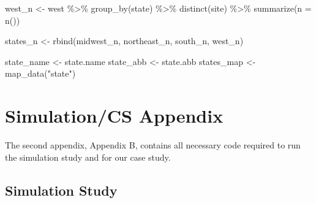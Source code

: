 \documentclass[12pt, twoside]{amherstthesis}
\newenvironment{Shaded}{\begin{snugshade}}{\end{snugshade}}
\newcommand{\AttributeTok}[1]{\textcolor[rgb]{0.77,0.63,0.00}{#1}}
\newcommand{\FunctionTok}[1]{\textcolor[rgb]{0.00,0.00,0.00}{#1}}
\newcommand{\NormalTok}[1]{#1}
\newcommand{\OtherTok}[1]{\textcolor[rgb]{0.56,0.35,0.01}{#1}}
\newcommand{\SpecialCharTok}[1]{\textcolor[rgb]{0.00,0.00,0.00}{#1}}
\newcommand{\StringTok}[1]{\textcolor[rgb]{0.31,0.60,0.02}{#1}}
\begin{document}
\begin{Shaded}
\begin{Highlighting}[]
\NormalTok{west\_n }\OtherTok{\textless{}{-}}\NormalTok{ west }\SpecialCharTok{\%\textgreater{}\%}
  \FunctionTok{group\_by}\NormalTok{(state) }\SpecialCharTok{\%\textgreater{}\%}
  \FunctionTok{distinct}\NormalTok{(site) }\SpecialCharTok{\%\textgreater{}\%}
  \FunctionTok{summarize}\NormalTok{(}\AttributeTok{n =} \FunctionTok{n}\NormalTok{())}

\NormalTok{states\_n }\OtherTok{\textless{}{-}} \FunctionTok{rbind}\NormalTok{(midwest\_n, northeast\_n, south\_n, west\_n)}

\NormalTok{state\_name }\OtherTok{\textless{}{-}}\NormalTok{ state.name}
\NormalTok{state\_abb }\OtherTok{\textless{}{-}}\NormalTok{ state.abb}
\NormalTok{states\_map }\OtherTok{\textless{}{-}} \FunctionTok{map\_data}\NormalTok{(}\StringTok{"state"}\NormalTok{)}
\end{Highlighting}
\end{Shaded}
\hypertarget{simulationcs-appendix}{%
\chapter{Simulation/CS Appendix}\label{simulationcs-appendix}}

The second appendix, Appendix B, contains all necessary code required to run the simulation study and for our case study.

\hypertarget{simulation-study}{%
\section{Simulation Study}\label{simulation-study}}
\end{document}
